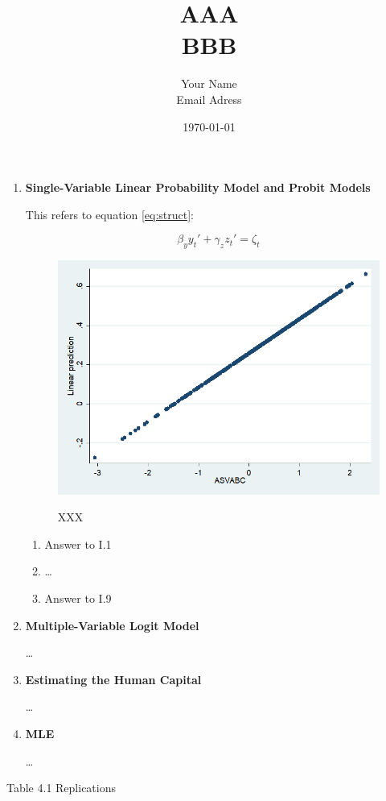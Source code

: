 \documentclass{article}
\title{AAA \\ \normalsize BBB}
\date{\today}
\author{Your Name \\Email Adress}
\begin{document}
\maketitle

\begin{enumerate}[I]

\item \textbf{Single-Variable Linear Probability Model and Probit Models}

This refers to equation \ref{eq:struct}:

\begin{equation}\label{eq:struct}
    \beta_y y_t' + \gamma_z z_t' = \zeta_t
\end{equation}

%

\begin{figure}
    \centering
    \includegraphics[scale = 0.15]{graphs/linear.png}
    \label{XXX}\caption{XXX}
\end{figure}
\FloatBarrier

\begin{enumerate}[1.]
    \item Answer to I.1
    
    \item \dots
    
    \item Answer to I.9
\end{enumerate}

\item\textbf{Multiple-Variable Logit Model}

\dots

\item\textbf{Estimating the Human Capital}

\dots

\item\textbf{MLE}

\dots

\end{enumerate}

Table 4.1 Replications 

\end{document}
